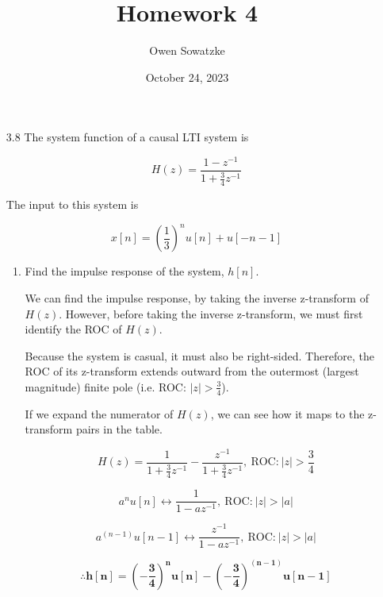 \documentclass[fleqn]{article}
\title{Homework 4}
\author{Owen Sowatzke}
\date{October 24, 2023}
\makeatletter
\newcommand{\zerodisplayskip}{
	\setlength{\abovedisplayskip}{0pt}%
	\setlength{\belowdisplayskip}{0pt}%
	\setlength{\abovedisplayshortskip}{0pt}%
	\setlength{\belowdisplayshortskip}{0pt}%
	\setlength{\mathindent}{0pt}}
\newenvironment{equationCenter}{\@fleqnfalse\begin{equation*}}{\end{equation*}}
\makeatother
\begin{document}
	\offinterlineskip
	\setlength{\lineskip}{12pt}
	\zerodisplayskip
	\maketitle
	\begin{enumerate}[nolistsep]
		\item[3.8] The system function of a causal LTI system is
	
		\begin{equationCenter}
			H(z) = \frac{1 - z^{-1}}{1 + \frac{3}{4}z^{-1}}
		\end{equationCenter}
		
		The input to this system is
		
		\begin{equationCenter}
			x[n] = \left(\frac{1}{3}\right)^nu[n] + u[-n-1]
		\end{equationCenter}
		
		\begin{enumerate}[nolistsep]
			\item Find the impulse response of the system, $h[n]$.
			
			We can find the impulse response, by taking the inverse z-transform of $H(z)$. However, before taking the inverse z-transform, we must first identify the ROC of $H(z)$.
			
			Because the system is casual, it must also be right-sided. Therefore, the ROC of its z-transform extends outward from
the outermost (largest magnitude) finite pole (i.e. ROC: $|z| > \frac{3}{4}$).

			If we expand the numerator of $H(z)$, we can see how it maps to the z-transform pairs in the table.
			
			\begin{equation*}
				H(z) = \frac{1}{1 + \frac{3}{4}z^{-1}} - \frac{z^{-1}}{1 + \frac{3}{4}z^{-1}},\ \text{ROC:}\ |z| > \frac{3}{4}
			\end{equation*}
			
			\begin{equation*}
				a^nu[n] \leftrightarrow \frac{1}{1 - az^{-1}},\ \text{ROC:}\ |z| > |a| 
			\end{equation*}
			
			\begin{equation*}
				a^{(n-1)}u[n-1] \leftrightarrow \frac{z^{-1}}{1 - az^{-1}},\ \text{ROC:}\ |z| > |a| 
			\end{equation*}
			
			\begin{equation*}
				\mathbf{\therefore h[n] = \left(-\frac{3}{4}\right)^nu[n] - \left(-\frac{3}{4}\right)^{(n-1)}u[n-1]}
			\end{equation*}
			

\end{enumerate}
\end{enumerate}
\end{document}

